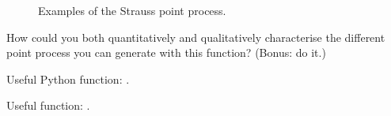 \begin{figure}[htbp]
\hfill
{}
\hfill
{}
\caption{Examples of the Strauss point process.}
\end{figure}


\begin{qbox}How could you both  quantitatively and qualitatively characterise the different point process you can generate with this function? (Bonus: do it.)
 
\end{qbox}



\begin{pcomment}
\begin{premark}Useful Python function: .
\end{premark}
\end{pcomment}


\begin{mcomment}
\begin{mremark}
Useful \matlabregistered{} function: .              
\end{mremark}
\end{mcomment}
                


